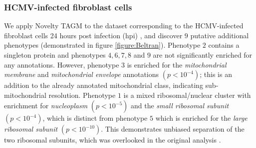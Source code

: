 \documentclass[12pt,english]{article}
\begin{document}
\subsubsection{HCMV-infected fibroblast cells} 
We apply Novelty TAGM to the dataset corresponding to the HCMV-infected fibroblast cells 24 hours post infection (hpi) \citep{Jean_Beltran:2016}, and discover $9$ putative additional phenotypes (demonstrated in figure \ref{figure:Beltran}). Phenotype $2$ contains a singleton protein and phenotypes $4,6,7,8$ and $9$ are not significantly enriched for any annotations. However, phenotype $3$ is enriched for the \textit{mitochondrial membrane} and  \textit{mitochondrial envelope} annotations $(p < 10^{-4})$; this is an addition to the already annotated mitochondrial class, indicating sub-mitochondrial resolution. Phenotype $1$ is a mixed ribosomal/nuclear cluster with enrichment for \textit{nucleoplasm} $(p < 10^{-5})$ and the \textit{small ribosomal subunit} $(p < 10^{-4})$, which is distinct from phenotype $5$ which is enriched for the \textit{large ribosomal subunit} $(p < 10^{-10})$. This demonstrates unbiased separation of the two ribosomal subunits, which was overlooked in the original analysis \citep{Jean_Beltran:2016}.
\end{document}

